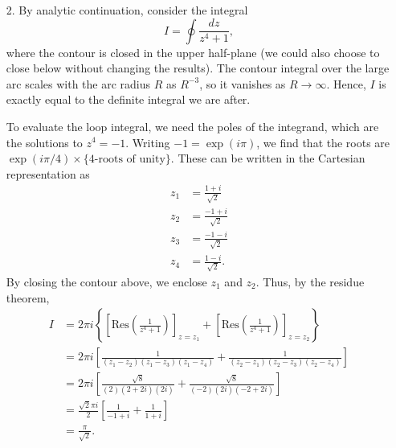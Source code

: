 \documentclass[10pt,a4paper]{article}
\begin{document}
\begin{enumerate}
\item[2.]
By analytic continuation, consider the integral
\begin{equation}
  I = \oint \frac{dz}{z^4 + 1},
\end{equation}
where the contour is closed in the upper half-plane (we could also
choose to close below without changing the results). The contour
integral over the large arc scales with the arc radius $R$ as
$R^{-3}$, so it vanishes as $R \rightarrow \infty$. Hence, $I$ is
exactly equal to the definite integral we are after.

To evaluate the loop integral, we need the poles of the integrand,
which are the solutions to $z^4 = -1$. Writing $-1 = \exp(i\pi)$, we
find that the roots are $\exp(i\pi/4) \times \{\text{4-roots of
  unity}\}.$ These can be written in the Cartesian representation as
\begin{align}
  z_1 &= \frac{1+i}{\sqrt{2}} \\ z_2 &= \frac{-1+i}{\sqrt{2}} \\ z_3 &= \frac{-1-i}{\sqrt{2}} \\ z_4 &= \frac{1-i}{\sqrt{2}}.
\end{align}
By closing the contour above, we enclose $z_1$ and $z_2$. Thus, by
the residue theorem,
\begin{align}
  I &= 2\pi i \left\{\left[\mathrm{Res} \left(\frac{1}{z^4 + 1}\right)\right]_{z=z_1} + \left[\mathrm{Res} \left(\frac{1}{z^4 + 1}\right)\right]_{z=z_2}\right\} \\
  &= 2\pi i\left[\frac{1}{(z_1-z_2)(z_1-z_3)(z_1-z_4)} + \frac{1}{(z_2-z_1)(z_2-z_3)(z_2-z_4)}\right] \\
  &= 2\pi i \left[\frac{\sqrt{8}}{(2)(2+2i)(2i)} + \frac{\sqrt{8}}{(-2)(2i)(-2+2i)}\right] \\
  &= \frac{\sqrt{2}\pi i}{2} \left[\frac{1}{-1+i} + \frac{1}{1+i}\right] \\
  &= \frac{\pi}{\sqrt{2}}.
\end{align}


\end{enumerate}
\end{document}
